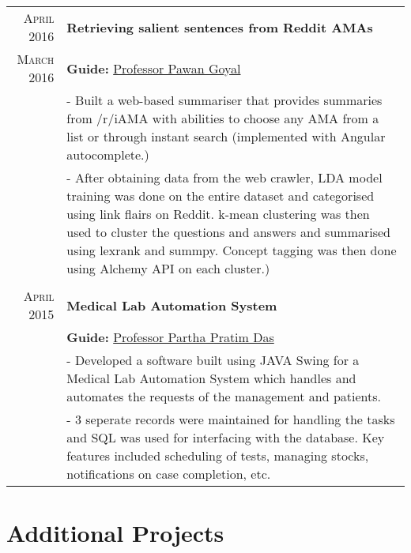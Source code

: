 \documentclass[a4paper,10pt]{extarticle} %
\begin{document}
\begin{tabular}{r|p{16cm}}

\textsc{April 2016} & \textbf{Retrieving salient sentences from Reddit AMAs} \\
\textsc{March 2016} & \textbf{Guide: }\textmd{\href{http://cse.iitkgp.ac.in/~pawang/}{Professor Pawan Goyal}}\\
& \footnotesize{- Built a web-based summariser that provides summaries from /r/iAMA with abilities to choose any AMA from a list or through instant search (implemented with Angular autocomplete.)}\\
& \footnotesize{- After obtaining data from the web crawler, LDA model training was done on the entire dataset and categorised using link flairs on Reddit. k-mean clustering was then used to cluster the questions and answers and summarised using lexrank and summpy. Concept tagging was then done using Alchemy API on each cluster.)}\\
\multicolumn{2}{c}{} \\

\textsc{April 2015} & \textbf{Medical Lab Automation System}\\
& \textbf{Guide: }\textmd{\href{http://www.iitkgp.ac.in/fac-profiles/showprofile.php?empcode=SSmUZ}{Professor Partha Pratim Das}}\\
& \footnotesize{- Developed a software built using JAVA Swing for a Medical Lab Automation System which handles and automates the requests of the management and patients.}\\
& \footnotesize{- 3 seperate records were maintained for handling the tasks and SQL was used for interfacing with the database. Key features included scheduling of tests, managing stocks, notifications on case completion, etc.}\\

\end{tabular}

\section{Additional Projects}
\end{document}
